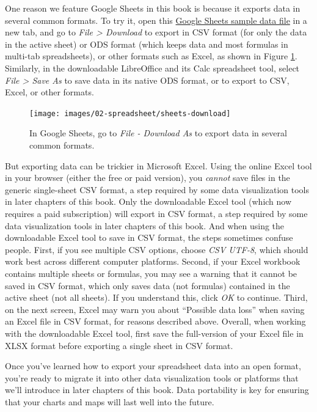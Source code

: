 \documentclass[
  english,
]{book}
\begin{document}
One reason we feature Google Sheets in this book is because it exports data in several common formats. To try it, open this \href{https://docs.google.com/spreadsheets/d/1eXWG6sSb6ZL4pKvCsCjcqeJ8l4vqbckuYEBj8T-uefo/}{Google Sheets sample data file} in a new tab, and go to \emph{File \textgreater{} Download} to export in CSV format (for only the data in the active sheet) or ODS format (which keeps data and most formulas in multi-tab spreadsheets), or other formats such as Excel, as shown in Figure \ref{fig:sheets-download}. Similarly, in the downloadable LibreOffice and its Calc spreadsheet tool, select \emph{File \textgreater{} Save As} to save data in its native ODS format, or to export to CSV, Excel, or other formats.



\begin{figure}
\texttt{[image: images/02-spreadsheet/sheets-download]} \caption{In Google Sheets, go to \emph{File - Download As} to export data in several common formats.}\label{fig:sheets-download}
\end{figure}

But exporting data can be trickier in Microsoft Excel. Using the online Excel tool in your browser (either the free or paid version), you \emph{cannot} save files in the generic single-sheet CSV format, a step required by some data visualization tools in later chapters of this book. Only the downloadable Excel tool (which now requires a paid subscription) will export in CSV format, a step required by some data visualization tools in later chapters of this book. And when using the downloadable Excel tool to save in CSV format, the steps sometimes confuse people. First, if you see multiple CSV options, choose \emph{CSV UTF-8}, which should work best across different computer platforms. Second, if your Excel workbook contains multiple sheets or formulas, you may see a warning that it cannot be saved in CSV format, which only saves data (not formulas) contained in the active sheet (not all sheets). If you understand this, click \emph{OK} to continue. Third, on the next screen, Excel may warn you about ``Possible data loss'' when saving an Excel file in CSV format, for reasons described above. Overall, when working with the downloadable Excel tool, first save the full-version of your Excel file in XLSX format before exporting a single sheet in CSV format.

Once you've learned how to export your spreadsheet data into an open format, you're ready to migrate it into other data visualization tools or platforms that we'll introduce in later chapters of this book. Data portability is key for ensuring that your charts and maps will last well into the future.
\end{document}
